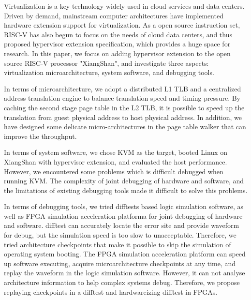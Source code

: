 \begin{eabstract}
Virtualization is a key technology widely used in cloud services and data centers.
Driven by demand, mainstream computer architectures have implemented hardware extension support for virtualization.
As a open source instruction set, RISC-V has also begun to focus on the needs of cloud data centers, 
and thus proposed hypervisor extension specification, which provides a huge space for research.
In this paper, we focus on adding hypervisor extension to the open source RISC-V processor "XiangShan", 
and investigate three aspects: virtualization microarchitecture, system software, and debugging tools.

In terms of microarchitecture, 
we adopt a distributed L1 TLB and a centralized address translation engine to balance translation speed and timing pressure.
By caching the second stage page table in the L2 TLB, it is possible to speed up the translation from guest physical address to host physical address.
In addition, we have designed some delicate micro-architectures in the page table walker that can improve the throughput.

In terms of system software, we chose KVM as the target, 
booted Linux on XiangShan with hypervisor extension, and evaluated the host performance.
However, we encountered some problems which is difficult debugged when running KVM. 
The complexity of joint debugging of hardware and software,
and the limitations of existing debugging tools made it difficult to solve this problems.
  
In terms of debugging tools, we tried difftests based logic simulation software, 
as well as FPGA simulation acceleration platforma for joint debugging of hardware and software.
difftest can accurately locate the error site and provide waveform for debug,
but the simulation speed is too slow to unacceptable.
Therefore, we tried architecture checkpoints that make it possible to skip the simulation of operating system booting.
The FPGA simulation acceleration platform can speed up software executing, acquire microarchitecture checkpoints at any time, 
and replay the waveform in the logic simulation software.
However, it can not analyse architecture information to help complex systems debug.
Therefore, we propose replaying checkpoints in a difftest and hardwareizing difftest in FPGAs.
\end{eabstract}
